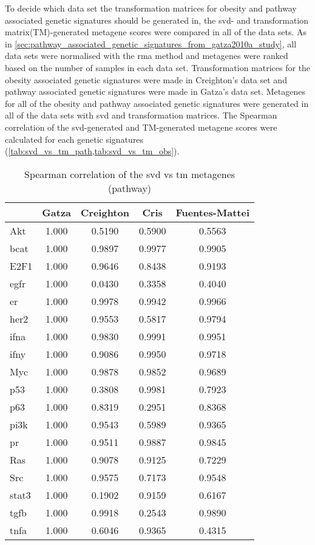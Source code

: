 To decide which data set the transformation matrices for obesity and pathway associated genetic signatures should be generated in, the \gls{svd}- and transformation matrix(TM)-generated metagene scores were compared in all of the data sets.
As in \cref{sec:pathway_associated_genetic_signatures_from_gatza2010a_study}, all data sets were normalised with the \gls{rma} method and metagenes were ranked based on the number of samples in each data set.
Transformation matrices for the obesity associated genetic signatures were made in Creighton's data set and pathway associated genetic signatures were made in Gatza's data set.
Metagenes for all of the obesity and pathway associated genetic signatures were generated in all of the data sets with \gls{svd} and transformation matrices.
The Spearman correlation of the \gls{svd}-generated and TM-generated metagene scores were calculated for each genetic signatures (\cref{tab:svd_vs_tm_path,tab:svd_vs_tm_obs}).

\begin{table}[htpb]
	\centering
	\caption{Spearman correlation of the svd vs tm metagenes (pathway)}
	\label{tab:svd_vs_tm_path}
	\begin{tabular}{lcccc}
		& Gatza & Creighton & Cris & Fuentes-Mattei\\
		\hline
		\hline
		\rule{0pt}{2.25ex}Akt & 1.000 & 0.5190 & 0.5900 & 0.5563 \\
		\gls{bcat}            & 1.000 & 0.9897 & 0.9977 & 0.9905 \\
		E2F1                  & 1.000 & 0.9646 & 0.8438 & 0.9193 \\
		\gls{egfr}            & 1.000 & 0.0430 & 0.3358 & 0.4040 \\
		\gls{er}              & 1.000 & 0.9978 & 0.9942 & 0.9966 \\
		\gls{her2}            & 1.000 & 0.9553 & 0.5817 & 0.9794 \\
		\gls{ifna}            & 1.000 & 0.9830 & 0.9991 & 0.9951 \\
		\gls{ifny}            & 1.000 & 0.9086 & 0.9950 & 0.9718 \\
		Myc                   & 1.000 & 0.9878 & 0.9852 & 0.9689 \\
		p53                   & 1.000 & 0.3808 & 0.9981 & 0.7923 \\
		p63                   & 1.000 & 0.8319 & 0.2951 & 0.8368 \\
		\gls{pi3k}            & 1.000 & 0.9543 & 0.5989 & 0.9365 \\
		\gls{pr}              & 1.000 & 0.9511 & 0.9887 & 0.9845 \\
		Ras                   & 1.000 & 0.9078 & 0.9125 & 0.7229 \\
		Src                   & 1.000 & 0.9575 & 0.7173 & 0.9548 \\
		\gls{stat3}           & 1.000 & 0.1902 & 0.9159 & 0.6167 \\
		\gls{tgfb}            & 1.000 & 0.9918 & 0.2543 & 0.9890 \\
		\gls{tnfa}            & 1.000 & 0.6046 & 0.9365 & 0.4315 \\
		\hline
		\hline
	\end{tabular}
\end{table}


